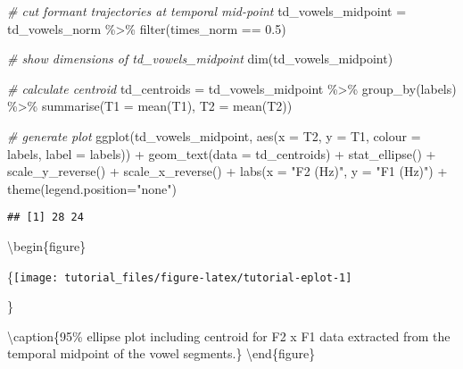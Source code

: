 \documentclass[
]{book}
\newenvironment{Shaded}{\begin{snugshade}}{\end{snugshade}}
\newcommand{\AttributeTok}[1]{\textcolor[rgb]{0.77,0.63,0.00}{#1}}
\newcommand{\CommentTok}[1]{\textcolor[rgb]{0.56,0.35,0.01}{\textit{#1}}}
\newcommand{\FloatTok}[1]{\textcolor[rgb]{0.00,0.00,0.81}{#1}}
\newcommand{\FunctionTok}[1]{\textcolor[rgb]{0.00,0.00,0.00}{#1}}
\newcommand{\NormalTok}[1]{#1}
\newcommand{\OtherTok}[1]{\textcolor[rgb]{0.56,0.35,0.01}{#1}}
\newcommand{\SpecialCharTok}[1]{\textcolor[rgb]{0.00,0.00,0.00}{#1}}
\newcommand{\StringTok}[1]{\textcolor[rgb]{0.31,0.60,0.02}{#1}}
\begin{document}
\begin{Shaded}
\begin{Highlighting}[]
\CommentTok{\# cut formant trajectories at temporal mid{-}point}
\NormalTok{td\_vowels\_midpoint }\OtherTok{=}\NormalTok{ td\_vowels\_norm }\SpecialCharTok{\%\textgreater{}\%} 
  \FunctionTok{filter}\NormalTok{(times\_norm }\SpecialCharTok{==} \FloatTok{0.5}\NormalTok{)}

\CommentTok{\# show dimensions of td\_vowels\_midpoint}
\FunctionTok{dim}\NormalTok{(td\_vowels\_midpoint)}

\CommentTok{\# calculate centroid }
\NormalTok{td\_centroids }\OtherTok{=}\NormalTok{ td\_vowels\_midpoint }\SpecialCharTok{\%\textgreater{}\%}
  \FunctionTok{group\_by}\NormalTok{(labels) }\SpecialCharTok{\%\textgreater{}\%}
  \FunctionTok{summarise}\NormalTok{(}\AttributeTok{T1 =} \FunctionTok{mean}\NormalTok{(T1), }\AttributeTok{T2 =} \FunctionTok{mean}\NormalTok{(T2))}

\CommentTok{\# generate plot}
\FunctionTok{ggplot}\NormalTok{(td\_vowels\_midpoint, }\FunctionTok{aes}\NormalTok{(}\AttributeTok{x =}\NormalTok{ T2, }\AttributeTok{y =}\NormalTok{ T1, }\AttributeTok{colour =}\NormalTok{ labels, }\AttributeTok{label =}\NormalTok{ labels)) }\SpecialCharTok{+} 
  \FunctionTok{geom\_text}\NormalTok{(}\AttributeTok{data =}\NormalTok{ td\_centroids) }\SpecialCharTok{+}
  \FunctionTok{stat\_ellipse}\NormalTok{() }\SpecialCharTok{+}
  \FunctionTok{scale\_y\_reverse}\NormalTok{() }\SpecialCharTok{+} \FunctionTok{scale\_x\_reverse}\NormalTok{() }\SpecialCharTok{+} 
  \FunctionTok{labs}\NormalTok{(}\AttributeTok{x =} \StringTok{"F2 (Hz)"}\NormalTok{, }\AttributeTok{y =} \StringTok{"F1 (Hz)"}\NormalTok{) }\SpecialCharTok{+}
  \FunctionTok{theme}\NormalTok{(}\AttributeTok{legend.position=}\StringTok{"none"}\NormalTok{)}
\end{Highlighting}
\end{Shaded}

\begin{verbatim}
## [1] 28 24
\end{verbatim}

\textbackslash begin\{figure\}

\{\centering \texttt{[image: tutorial\_files/figure-latex/tutorial-eplot-1]}

\}

\textbackslash caption\{95\% ellipse plot including centroid for F2 x F1 data extracted from the temporal midpoint of the vowel segments.\}\label{fig:tutorial-eplot}
\textbackslash end\{figure\}
\end{document}
